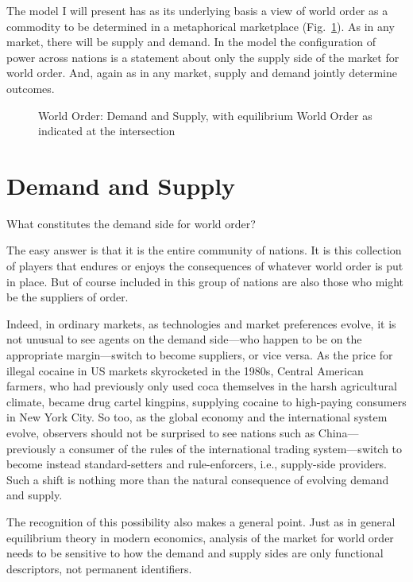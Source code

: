The model I will present has as its underlying basis a view
of world order as a commodity to be determined in a metaphorical
marketplace (Fig.~\ref{Fig:WOMarket}).
As in any market, there will be supply and demand.
In the model the configuration of power across nations is a statement about
only the supply side of the market for world order.
And, again as in any market, supply and demand jointly determine
outcomes.

\begin{figure}
\begin{minipage}[c]{0.9\textwidth}
\begin{tikzpicture}[scale=1.0]

\end{tikzpicture}
\end{minipage}%
\caption{
World Order: Demand and Supply, with equilibrium
World Order as indicated at the intersection
}
\label{Fig:WOMarket}
\end{figure}

\section{Demand and Supply}

What constitutes the demand side for world order?

The easy answer is that it is the entire community of nations.
It is this collection of players
that endures or enjoys the consequences
of whatever world order is put in place.
But of course included in this group of nations are also those
who might be the suppliers of order.

Indeed, in ordinary markets, as technologies and market preferences evolve,
it is not unusual to see agents on the demand side---who happen to be
on the appropriate margin---switch to become suppliers, or vice versa.
As the price for illegal cocaine in US markets skyrocketed in the 1980s,
Central American farmers, who had previously only used coca themselves
in the harsh agricultural climate, became drug cartel kingpins, supplying
cocaine to high-paying consumers in New York City.
So too, as the global economy and the international system evolve, observers
should not be surprised to see nations such as China---previously a consumer
of the rules of the international trading system---switch to become instead
standard-setters and rule-enforcers, i.e., supply-side providers.
Such a shift is nothing more than the natural consequence of
evolving demand and supply.

The recognition of this possibility also makes a general point. Just as in
general equilibrium theory in modern economics, analysis of the
market for world order needs to be sensitive to how the demand
and supply sides are only functional descriptors, not permanent identifiers.


